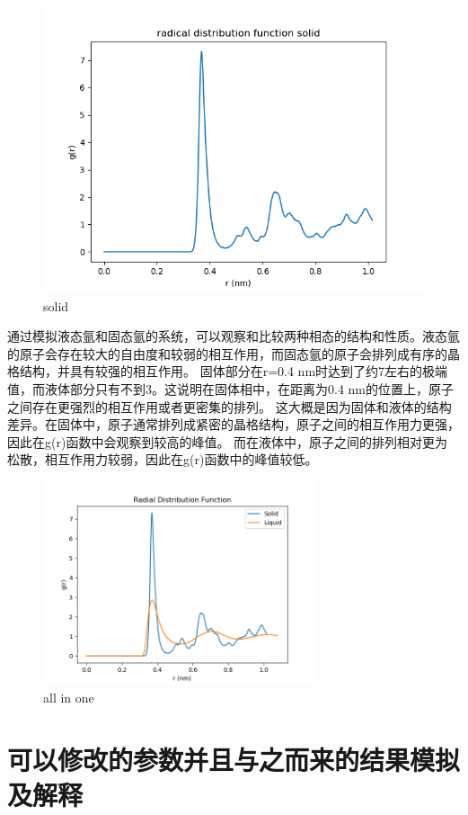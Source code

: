 \documentclass[12pt, a4paper, oneside]{ctexart}
\begin{document}
\begin{spacing}{2.0}
\begin{figure}[H]
\begin{minipage}[t]{0.5\linewidth}
        \includegraphics[scale=0.5]{radial distribution function solid.png}
        \caption{solid}
        \label{fig:side:b}
      \end{minipage}
\end{figure}


通过模拟液态氩和固态氩的系统，可以观察和比较两种相态的结构和性质。液态氩的原子会存在较大的自由度和较弱的相互作用，而固态氩的原子会排列成有序的晶格结构，并具有较强的相互作用。
固体部分在r=0.4 nm时达到了约7左右的极端值，而液体部分只有不到3。这说明在固体相中，在距离为0.4 nm的位置上，原子之间存在更强烈的相互作用或者更密集的排列。
这大概是因为固体和液体的结构差异。在固体中，原子通常排列成紧密的晶格结构，原子之间的相互作用力更强，因此在g(r)函数中会观察到较高的峰值。
而在液体中，原子之间的排列相对更为松散，相互作用力较弱，因此在g(r)函数中的峰值较低。
\begin{figure}[H]
	\centering
	\includegraphics[width=8cm]{Radial Distribution Function2.png}
	\caption{all in one}
\end{figure}

\section{可以修改的参数并且与之而来的结果模拟及解释}

\end{spacing}{}


\end{document}
